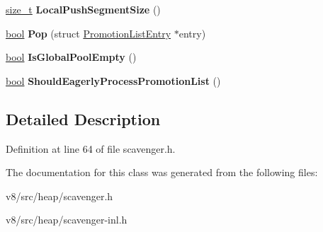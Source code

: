 \begin{DoxyCompactItemize}
\mbox{\hyperlink{classsize__t}{size\+\_\+t}} {\bfseries Local\+Push\+Segment\+Size} ()
\item 
\mbox{\label{classv8_1_1internal_1_1Scavenger_1_1PromotionList_1_1View_a98b9293937ff2753464297cb8b299df5}} 
\mbox{\hyperlink{classbool}{bool}} {\bfseries Pop} (struct \mbox{\hyperlink{structv8_1_1internal_1_1Scavenger_1_1PromotionListEntry}{Promotion\+List\+Entry}} $\ast$entry)
\item 
\mbox{\label{classv8_1_1internal_1_1Scavenger_1_1PromotionList_1_1View_a5fd86c3873adf129a518267e3faa214f}} 
\mbox{\hyperlink{classbool}{bool}} {\bfseries Is\+Global\+Pool\+Empty} ()
\item 
\mbox{\label{classv8_1_1internal_1_1Scavenger_1_1PromotionList_1_1View_a07cf94bbc883dd1ba032f5b1a0ea8cdf}} 
\mbox{\hyperlink{classbool}{bool}} {\bfseries Should\+Eagerly\+Process\+Promotion\+List} ()
\end{DoxyCompactItemize}


\subsection{Detailed Description}


Definition at line 64 of file scavenger.\+h.



The documentation for this class was generated from the following files\+:\begin{DoxyCompactItemize}
\item 
v8/src/heap/scavenger.\+h\item 
v8/src/heap/scavenger-\/inl.\+h\end{DoxyCompactItemize}
